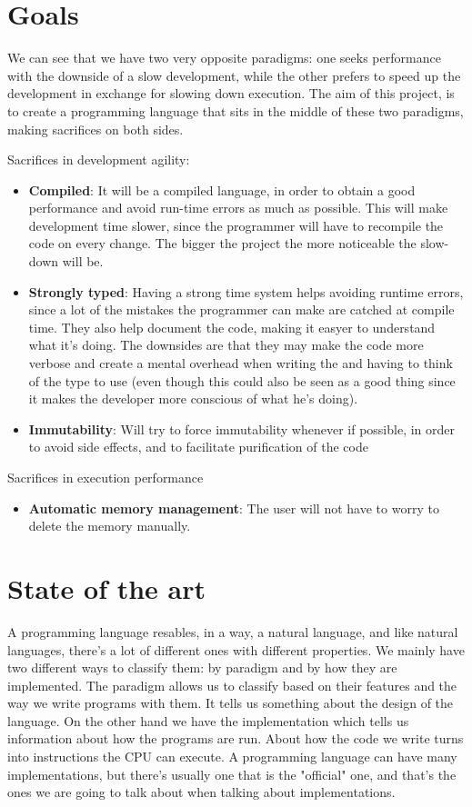 ﻿\documentclass[10pt,a4paper,twocolumn,twoside]{article}
\begin{document}
\section{Goals}

We can see that we have two very opposite paradigms: one seeks performance with
the downside of a slow development, while the other prefers to speed up the
development in exchange for slowing down execution. The aim of this project, is
to create a programming language that sits in the middle of these two paradigms,
making sacrifices on both sides.

Sacrifices in development agility:
\begin{itemize}
     \item \textbf{Compiled}: It will be a compiled language, in order to obtain a
         good performance and avoid run-time errors as much as possible. This 
         will make development time slower, since the programmer will have to
         recompile the code on every change. The bigger the project the more 
         noticeable the slow-down will be.
     \item \textbf{Strongly typed}: Having a strong time system helps avoiding
         runtime errors, since a lot of the mistakes the programmer can make are
         catched at compile time. They also help document the code, making it 
         easyer to understand what it's doing. The downsides are that they may 
         make the code more verbose and create a mental overhead when writing 
         the and having to think of the type to use (even though this could also 
         be seen as a good thing since it makes the developer more conscious of 
         what he's doing).
     \item \textbf{Immutability}: Will try to force immutability whenever
         if possible, in order to avoid side effects, and to facilitate purification
         of the code
\end{itemize}

Sacrifices in execution performance
\begin{itemize}
     \item \textbf{Automatic memory management}: The user will not have to worry
         to delete the memory manually.
\end{itemize}

\section{State of the art}
A programming language resables, in a way, a natural language, and like natural
languages, there's a lot of different ones with different properties. We mainly
have two different ways to classify them: by paradigm and by how they are
implemented. The paradigm allows us to classify based on their features and the
way we write programs with them. It tells us something about the design of the
language. On the other hand we have the implementation which tells us
information about how the programs are run. About how the code we write turns
into instructions the CPU can execute. A programming language can have many
implementations, but there's usually one that is the "official" one, and that's
the ones we are going to talk about when talking about implementations.
\end{document}
